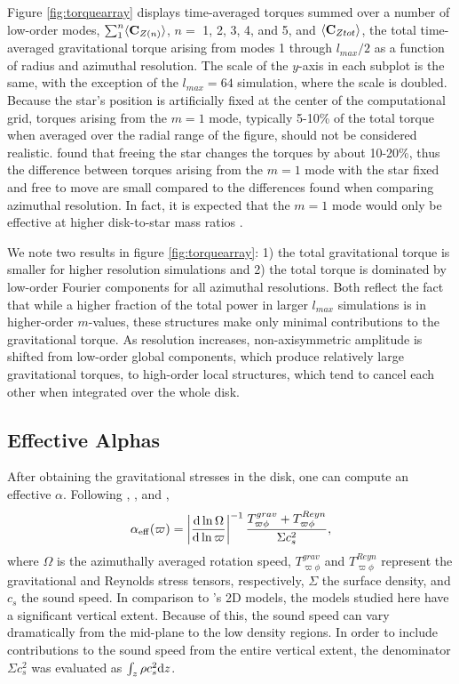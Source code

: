 \documentclass[manuscript]{aastex}
\begin{document}
Figure \ref{fig:torquearray} displays 
 time-averaged torques summed over a number of low-order modes, $\sum_1^n \langle {\rm \bf C}_{Z(n)} \rangle$, $n = $ 1, 2, 3, 4, and 5, and $\langle {\rm \bf C}_{Ztot} \rangle$,
the total time-averaged gravitational torque arising from modes 1 through $l_{max}/2$
as a function of radius and azimuthal resolution. 
The scale of the $y$-axis in each subplot is the same, with the exception of the $l_{max} = 64$ simulation, 
where the scale is doubled.  
Because the star's position is artificially fixed at the center of the computational grid, 
torques arising from the $m=1$ mode,
typically 5-10\% of the total torque when averaged over the radial range of the figure,
should not be considered realistic.  
\citet{michael2010} found that freeing the star changes the torques by about 10-20\%, 
thus the difference between torques arising from the $m=1$ mode with the star fixed and free to move are small compared
to the differences found when comparing azimuthal resolution. In fact, it is expected that the $m =1$ mode would only be
effective at higher disk-to-star mass ratios \citep{shu1990}.

We note two results in figure \ref{fig:torquearray}: 1) the total gravitational torque is smaller for higher resolution simulations and 2) the total torque is dominated by low-order Fourier components for all azimuthal resolutions. Both reflect the fact that while a higher fraction of the total power in larger $l_{max}$ simulations is in higher-order $m$-values, these structures make only minimal contributions to the gravitational torque. As resolution increases, non-axisymmetric amplitude is shifted from 
low-order global components, which produce relatively large gravitational torques, to high-order local structures, which tend to cancel each other when integrated over the whole disk. 


\subsection{Effective Alphas}

After obtaining the gravitational stresses in the disk, one can compute an effective $\alpha$. 
Following \cite{gammie2001}, \citet{lodato2004}, and \citet{boley2006}, 
\begin{equation}
\label{alpha1}
\alpha_{\rm{eff}}(\varpi) = \left| \frac{{\rm d} \ln \Omega}{{\rm d} \ln \varpi} \right|^{-1} 
\frac {T_{\varpi\phi}^{grav} + T_{\varpi\phi}^{Reyn}}
{\Sigma c_s^2 },
\end{equation}
where $\Omega$ is the azimuthally averaged rotation speed, $T_{\varpi\phi}^{grav}$ and $T_{\varpi\phi}^{Reyn}$ represent the  gravitational and Reynolds stress tensors, respectively, $\Sigma$ the surface density,
and $c_s$ the sound speed. In comparison to \citeauthor{gammie2001}'s 2D models, the models studied here have a significant vertical extent. Because of this, the sound speed can vary dramatically from the mid-plane to the low density regions. In order to include contributions to the sound speed from the entire vertical extent, the denominator $\Sigma c_s^2$ was evaluated as $\int_z \rho c_s^2 {\rm d}z$.
 
\end{document}
